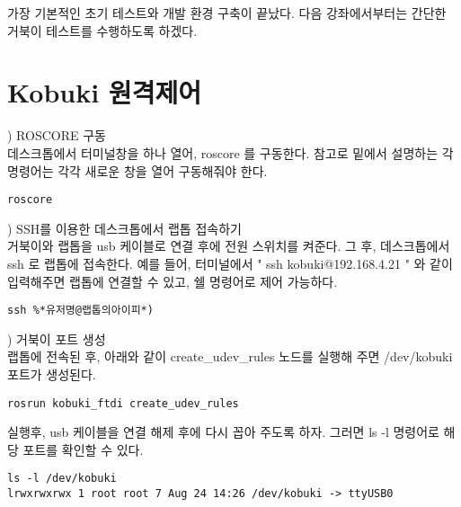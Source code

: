 가장 기본적인 초기 테스트와 개발 환경 구축이 끝났다. 다음 강좌에서부터는 간단한 거북이 테스트를 수행하도록 하겠다.

\section{Kobuki 원격제어}

\setcounter{num}{0}

\vspace{\baselineskip}
\noindent{}
\thenum) ROSCORE 구동\\
데스크톱에서 터미널창을 하나 열어, roscore 를 구동한다. 참고로 밑에서 설명하는 각 명령어는 각각 새로운 창을 열어 구동해줘야 한다.

\begin{lstlisting}[language=ROS]
roscore
\end{lstlisting}

\vspace{\baselineskip}
\noindent{}
\thenum) SSH를 이용한 데스크톱에서 랩톱 접속하기\\
거북이와 랩톱을 usb 케이블로 연결 후에 전원 스위치를 켜준다. 그 후, 데스크톱에서 ssh 로 랩톱에 접속한다. 예를 들어, 터미널에서 " ssh kobuki@192.168.4.21 " 와 같이 입력해주면 랩톱에 연결할 수 있고, 쉘 명령어로 제어 가능하다.

\begin{lstlisting}[language=ROS]
ssh %*유저명@랩톱의아이피*)
\end{lstlisting}

\vspace{\baselineskip}
\noindent{}
\thenum) 거북이 포트 생성\\
랩톱에 전속된 후, 아래와 같이 create\_udev\_rules 노드를 실행해 주면 /dev/kobuki 포트가 생성된다. 

\begin{lstlisting}[language=ROS]
rosrun kobuki_ftdi create_udev_rules
\end{lstlisting}

실행후, usb 케이블을 연결 해제 후에 다시 꼽아 주도록 하자. 그러면 ls -l 명령어로 해당 포트를 확인할 수 있다.

\begin{lstlisting}[language=ROS]
ls -l /dev/kobuki
lrwxrwxrwx 1 root root 7 Aug 24 14:26 /dev/kobuki -> ttyUSB0
\end{lstlisting}

